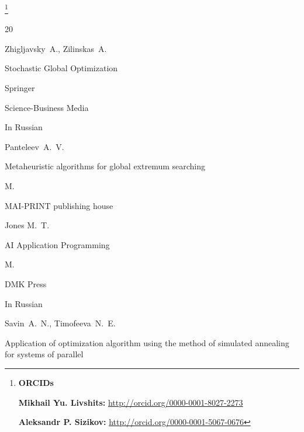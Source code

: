 \pagebreak





\thanks{{\bf ORCIDs}



{\bf Mikhail Yu. Livshits:} \url{http://orcid.org/0000-0001-8027-2273}



{\bf Aleksandr P. Sizikov:} \url{http://orcid.org/0000-0001-5067-0676}

}





\EngRef

\begin{thebibliography}{20}




\by Zhigljavsky~A., Zilinskas~A.

\book Stochastic Global Optimization

\publ Springer

Science-Business Media






\lang In Russian

\by Panteleev~A.~V.

\book Metaheuristic algorithms for global extremum searching

\publaddr M.

\publ MAI-PRINT publishing house






\by Jones M.~T.

\book AI Application Programming

\publaddr M.

\publ DMK Press






\lang In Russian

\by Savin~A.~N., Timofeeva~N.~E.

\paper Application of optimization algorithm using the method of simulated annealing for systems of parallel


\end{thebibliography}
